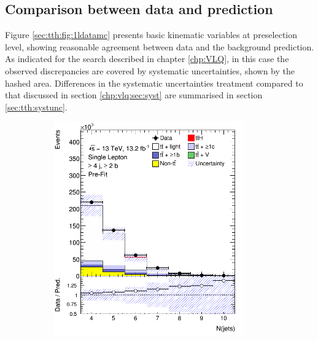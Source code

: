 \subsection{Comparison between data and prediction}

Figure \ref{sec:tth:fig:1ldatamc}  presents basic kinematic variables at preselection level, showing reasonable agreement between data and the background prediction. As indicated for the search described in chapter \ref{chp:VLQ}, in this case the observed discrepancies are covered by systematic uncertainties, shown by the hashed area. Differences in the systematic uncertainties treatment compared to that discussed in section \ref{chp:vlq:sec:syst} are summarised in section \ref{sec:tth:systunc}.


\begin{figure}[p]
\begin{subfigure}{0.33\textwidth}
  \centering
  \includegraphics[width=0.9\textwidth]{figures/ttH/presel/ljets_nJets_ge4jge2b.png}
  \caption{}
  \label{}
\end{subfigure}
\begin{subfigure}{0.33\textwidth}
  \centering

\end{subfigure}
\end{figure}
